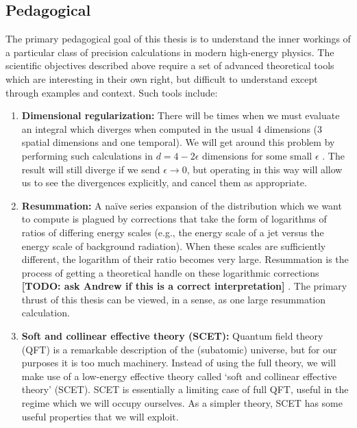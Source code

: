 \documentclass[12pt,twoside,class=../reedthesis, crop=false]{standalone}
\begin{document}
\subsection{Pedagogical}
	The primary pedagogical goal of this thesis is to understand the inner workings of a particular class of precision calculations in modern high-energy physics. The scientific objectives described above require a set of advanced theoretical tools which are interesting in their own right, but difficult to understand except through examples and context. Such tools include:
	\begin{enumerate}
		\item \textbf{Dimensional regularization:} There will be times when we must evaluate an integral which diverges when computed in the usual 4 dimensions (3 spatial dimensions and one temporal). We will get around this problem by performing such calculations in $d = 4 - 2\epsilon$ dimensions for some small $\epsilon$ \cite{schwartz_quantum_2014}. The result will still diverge if we send $\epsilon \to 0$, but operating in this way will allow us to see the divergences explicitly, and cancel them as appropriate.

		\item \textbf{Resummation:} A na\"ive series expansion of the distribution which we want to compute is plagued by corrections that take the form of logarithms of ratios of differing energy scales (e.g., the energy scale of a jet versus the energy scale of background radiation). When these scales are sufficiently different, the logarithm of their ratio becomes very large. Resummation is the process of getting a theoretical handle on these logarithmic corrections {\color{red}\textbf{[TODO: ask Andrew if this is a correct interpretation]}} \cite{larkoski_elementary_2019-1}. The primary thrust of this thesis can be viewed, in a sense, as one large resummation calculation.

		\item \textbf{Soft and collinear effective theory (SCET):} Quantum field theory (QFT) is a remarkable description of the (subatomic) universe, but for our purposes it is too much machinery. Instead of using the full theory, we will make use of a low-energy effective theory called `soft and collinear effective theory' (SCET). SCET is essentially a limiting case of full QFT, useful in the regime which we will occupy ourselves. As a simpler theory, SCET has some useful properties that we will exploit.
	\end{enumerate}
\end{document}
